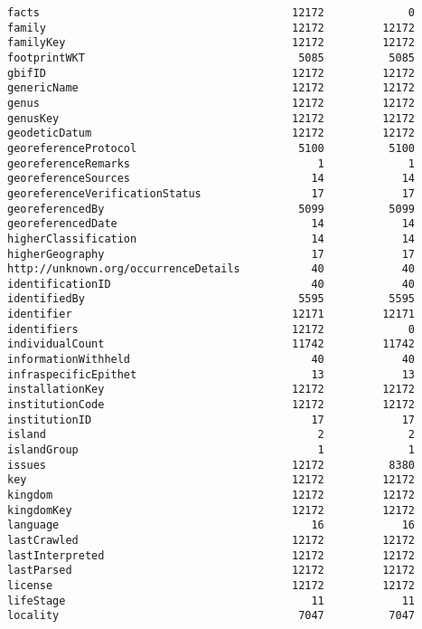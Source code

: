 \documentclass[11pt]{article}
\begin{document}
\begin{Verbatim}[commandchars=\\\{\}]
facts                                       12172             0
family                                      12172         12172
familyKey                                   12172         12172
footprintWKT                                 5085          5085
gbifID                                      12172         12172
genericName                                 12172         12172
genus                                       12172         12172
genusKey                                    12172         12172
geodeticDatum                               12172         12172
georeferenceProtocol                         5100          5100
georeferenceRemarks                             1             1
georeferenceSources                            14            14
georeferenceVerificationStatus                 17            17
georeferencedBy                              5099          5099
georeferencedDate                              14            14
higherClassification                           14            14
higherGeography                                17            17
http://unknown.org/occurrenceDetails           40            40
identificationID                               40            40
identifiedBy                                 5595          5595
identifier                                  12171         12171
identifiers                                 12172             0
individualCount                             11742         11742
informationWithheld                            40            40
infraspecificEpithet                           13            13
installationKey                             12172         12172
institutionCode                             12172         12172
institutionID                                  17            17
island                                          2             2
islandGroup                                     1             1
issues                                      12172          8380
key                                         12172         12172
kingdom                                     12172         12172
kingdomKey                                  12172         12172
language                                       16            16
lastCrawled                                 12172         12172
lastInterpreted                             12172         12172
lastParsed                                  12172         12172
license                                     12172         12172
lifeStage                                      11            11
locality                                     7047          7047

\end{Verbatim}
\end{document}
